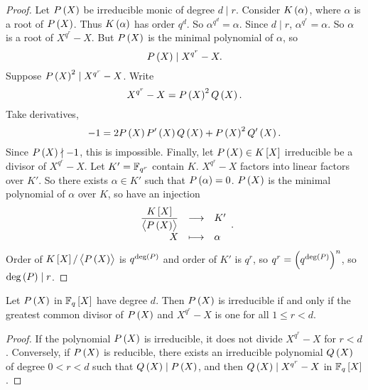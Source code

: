 \begin{proof}
Let $ P\br{X} $ be irreducible monic of degree $ d \mid r $. Consider $ K\br{\alpha} $, where $ \alpha $ is a root of $ P\br{X} $. Thus $ K\br{\alpha} $ has order $ q^d $. So $ \alpha^{q^d} = \alpha $. Since $ d \mid r $, $ \alpha^{q^r} = \alpha $. So $ \alpha $ is a root of $ X^{q^r} - X $. But $ P\br{X} $ is the minimal polynomial of $ \alpha $, so
$$ P\br{X} \mid X^{q^r} - X. $$
Suppose $ P\br{X}^2 \mid X^{q^r} - X $. Write
$$ X^{q^r} - X = P\br{X}^2Q\br{X}. $$
Take derivatives,
$$ -1 = 2P\br{X}P'\br{X}Q\br{X} + P\br{X}^2Q'\br{X}. $$
Since $ P\br{X} \nmid -1 $, this is impossible. Finally, let $ P\br{X} \in K\sbr{X} $ irreducible be a divisor of $ X^{q^r} - X $. Let $ K' = \mathbb{F}_{q^r} $ contain $ K $. $ X^{q^r} - X $ factors into linear factors over $ K' $. So there exists $ \alpha \in K' $ such that $ P\br{\alpha} = 0 $. $ P\br{X} $ is the minimal polynomial of $ \alpha $ over $ K $, so have an injection
$$ \function{\dfrac{K\sbr{X}}{\abr{P\br{X}}}}{K'}{X}{\alpha}. $$
Order of $ K\sbr{X} / \abr{P\br{X}} $ is $ q^{\deg\br{P}} $ and order of $ K' $ is $ q^r $, so $ q^r = \br{q^{\deg\br{P}}}^n $, so $ \deg\br{P} \mid r $.
\end{proof}

\begin{corollary}
Let $ P\br{X} $ in $ \F_q\sbr{X} $ have degree $ d $. Then $ P\br{X} $ is irreducible if and only if the greatest common divisor of $ P\br{X} $ and $ X^{q^r} - X $ is one for all $ 1 \le r < d $.
\end{corollary}

\begin{proof}
If the polynomial $ P\br{X} $ is irreducible, it does not divide $ X^{q^r} - X $ for $ r < d $. Conversely, if $ P\br{X} $ is reducible, there exists an irreducible polynomial $ Q\br{X} $ of degree $ 0 < r < d $ such that $ Q\br{X} \mid P\br{X} $, and then $ Q\br{X} \mid X^{q^r} - X $ in $ \F_q\sbr{X} $.
\end{proof}

